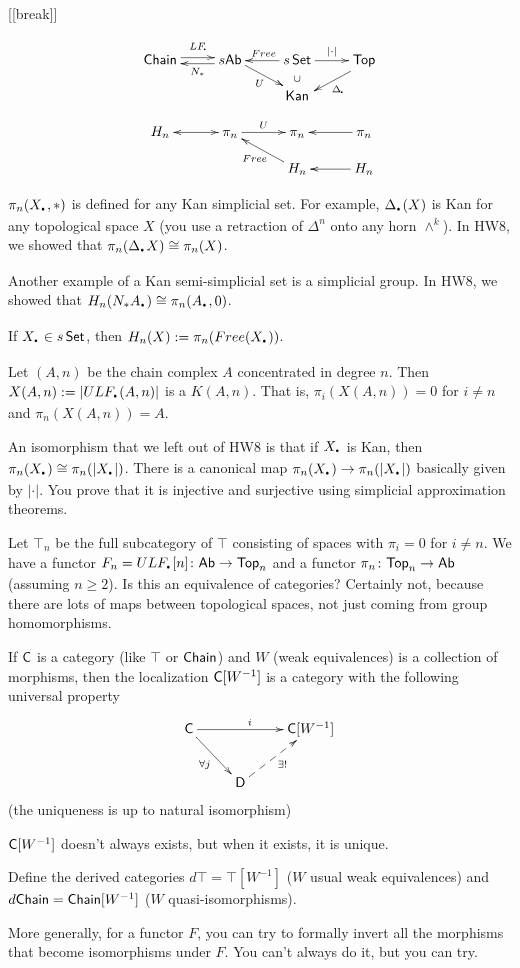 [[break]]

\[\xymatrix@R-1pc{
 \chain \ar@<.5ex>[r]^-{LF_\uudot}\ar@{<-}@<-.5ex>[r]_-{N_*} & s\ab \ar@<.5ex>[dr]_-U\ar@{<-}[r]^{Free} & s\set \ar[r]^-{|\cdot|} & \top\\
 & & \kan \ar@{}[u]|\cup \ar@{<-}@<-.5ex>[ur]_-{\Delta_\uudot} \\
 H_n \ar@{<->}[r] & \pi_n \ar[r]^U & \pi_n & \pi_n \ar[l]\\
  & & H_n \ar[ul]^{Free} & H_n\ar[l]
}\]

$\pi_n(X_\udot,*)$ is defined for any Kan simplicial set. For example, $\Delta_\udot(X)$ is Kan for any topological space $X$ (you use a retraction of $\Delta^n$ onto any horn $\wedge^k$). In HW8, we showed that $\pi_n(\Delta_\udot X)\cong \pi_n(X)$.

Another example of a Kan semi-simplicial set is a simplicial group. In HW8, we showed that $H_n(N_* A_\udot)\cong \pi_n(A_\udot,0)$.
\begin{definition}
 If $X_\udot\in s\set$, then $H_n(X):= \pi_n(Free(X_\udot))$.
\end{definition}
\begin{corollary}
 Let $(A,n)$ be the chain complex $A$ concentrated in degree $n$. Then $X(A,n):=|ULF_\udot(A,n)|$ is a $K(A,n)$. That is, $\pi_i(X(A,n))=0$ for $i\neq n$ and $\pi_n(X(A,n))=A$.
\end{corollary}
An isomorphism that we left out of HW8 is that if $X_\udot$ is Kan, then $\pi_n(X_\udot)\cong \pi_n(|X_\udot|)$. There is a canonical map $\pi_n(X_\udot)\to \pi_n(|X_\udot|)$ basically given by $|\cdot|$. You prove that it is injective and surjective using simplicial approximation theorems.

Let $\top_n$ be the full subcategory of $\top$ consisting of spaces with $\pi_i=0$ for $i\neq n$. We have a functor $F_n=ULF_\udot[n]\colon \ab\to \top_n$ and a functor $\pi_n\colon \text{\sf Top}_n\to \text{\sf Ab}$ (assuming $n\ge 2$). Is this an equivalence of categories? Certainly not, because there are lots of maps between topological spaces, not just coming from group homomorphisms.

If $\text{\sf C}$ is a category (like $\top$ or $\text{\sf Chain}$) and $W$ (weak equivalences) is a collection of morphisms, then the localization $\text{\sf C}[W^{-1}]$ is a category with the following universal property
\[\xymatrix{
 \C\ar[rr]^i \ar[dr]_{\forall j} & & \C[W^{-1}]\\
 & \D\ar@{-->}_{\exists !}[ur]
}\]
(the uniqueness is up to natural isomorphism)
\begin{remark}
 $\text{\sf C}[W^{-1}]$ doesn't always exists, but when it exists, it is unique.
\end{remark}
\begin{definition}
 Define the derived categories $d\top = \top[W^{-1}]$ ($W$ usual weak equivalences) and $d\text{\sf Chain}=\text{\sf Chain}[W^{-1}]$ ($W$ quasi-isomorphisms).
\end{definition}
More generally, for a functor $F$, you can try to formally invert all the morphisms that become isomorphisms under $F$. You can't always do it, but you can try.

